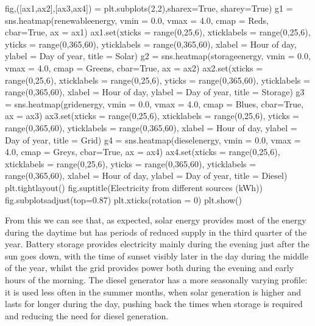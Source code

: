 \documentclass[letterpaper,10pt,english]{sphinxmanual}
\begin{document}
\begin{sphinxVerbatim}[commandchars=\\\{\}]
fig,([ax1,ax2],[ax3,ax4]) = plt.subplots(2,2)\PYGZsh{},sharex=True, sharey=True)
g1 = sns.heatmap(renewable\PYGZus{}energy,
                vmin = 0.0, vmax = 4.0,
                cmap = \PYGZsq{}Reds\PYGZsq{}, cbar=True, ax = ax1)
ax1.set(xticks = range(0,25,6), xticklabels = range(0,25,6),
      yticks = range(0,365,60), yticklabels = range(0,365,60),
      xlabel = \PYGZsq{}Hour of day\PYGZsq{}, ylabel = \PYGZsq{}Day of year\PYGZsq{},
      title = \PYGZsq{}Solar\PYGZsq{})
g2 = sns.heatmap(storage\PYGZus{}energy,
                vmin = 0.0, vmax = 4.0,
                cmap = \PYGZsq{}Greens\PYGZsq{}, cbar=True, ax = ax2)
ax2.set(xticks = range(0,25,6), xticklabels = range(0,25,6),
      yticks = range(0,365,60), yticklabels = range(0,365,60),
      xlabel = \PYGZsq{}Hour of day\PYGZsq{}, ylabel = \PYGZsq{}Day of year\PYGZsq{},
      title = \PYGZsq{}Storage\PYGZsq{})
g3 = sns.heatmap(grid\PYGZus{}energy,
                vmin = 0.0, vmax = 4.0,
                cmap = \PYGZsq{}Blues\PYGZsq{}, cbar=True, ax = ax3)
ax3.set(xticks = range(0,25,6), xticklabels = range(0,25,6),
      yticks = range(0,365,60), yticklabels = range(0,365,60),
      xlabel = \PYGZsq{}Hour of day\PYGZsq{}, ylabel = \PYGZsq{}Day of year\PYGZsq{},
      title = \PYGZsq{}Grid\PYGZsq{})
g4 = sns.heatmap(diesel\PYGZus{}energy,
                vmin = 0.0, vmax = 4.0,
                cmap = \PYGZsq{}Greys\PYGZsq{}, cbar=True, ax = ax4)
ax4.set(xticks = range(0,25,6), xticklabels = range(0,25,6),
      yticks = range(0,365,60), yticklabels = range(0,365,60),
      xlabel = \PYGZsq{}Hour of day\PYGZsq{}, ylabel = \PYGZsq{}Day of year\PYGZsq{},
      title = \PYGZsq{}Diesel\PYGZsq{})
plt.tight\PYGZus{}layout()
fig.suptitle(\PYGZsq{}Electricity from different sources (kWh)\PYGZsq{})
fig.subplots\PYGZus{}adjust(top=0.87)
plt.xticks(rotation = 0)
plt.show()
\end{sphinxVerbatim}

\noindent{}

\sphinxAtStartPar
From this we can see that, as expected, solar energy provides most of
the energy during the daytime but has periods of reduced supply in the
third quarter of the year. Battery storage provides electricity mainly
during the evening just after the sun goes down, with the time of sunset
visibly later in the day during the middle of the year, whilst the grid
provides power both during the evening and early hours of the morning.
The diesel generator has a more seasonally varying profile: it is used
less often in the summer months, when solar generation is higher and
lasts for longer during the day, pushing back the times when storage is
required and reducing the need for diesel generation.
\end{document}

